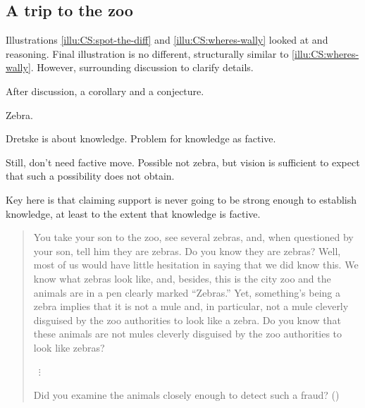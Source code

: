 \subsection{A trip to the zoo}

\begin{note}
  Illustrations \ref{illu:CS:spot-the-diff} and \ref{illu:CS:wheres-wally} looked at  and reasoning.
  Final illustration is no different, structurally similar to \autoref{illu:CS:wheres-wally}.
  However, surrounding discussion to clarify details.

  After discussion, a corollary and a conjecture.
\end{note}

\begin{note}
  Zebra.

  Dretske is about knowledge.
  Problem for knowledge as factive.

  Still, don't need factive move.
  Possible not zebra, but vision is sufficient to expect that such a possibility does not obtain.

  Key here is that claiming support is never going to be strong enough to establish knowledge, at least to the extent that knowledge is factive.
\end{note}

\begin{note}
  \begin{illustration}
    \label{illu:CS:dretske-zebra}
    \mbox{}
    \vspace{-\baselineskip}
  \begin{quote}
    You take your son to the zoo, see several zebras, and, when questioned by your son, tell him they are zebras.
    Do you know they are zebras?
    Well, most of us would have little hesitation in saying that we did know this.
    We know what zebras look like, and, besides, this is the city zoo and the animals are in a pen clearly marked ``Zebras.''
    Yet, something's being a zebra implies that it is not a mule and, in particular, not a mule cleverly disguised by the zoo authorities to look like a zebra.
    Do you know that these animals are not mules cleverly disguised by the zoo authorities to look like zebras?

    \mbox{ }\hfill \(\vdots\) \hfill\mbox{ }

    Did you examine the animals closely enough to detect such a fraud?\linebreak
    \mbox{}\hfill\mbox{(\citeyear[1015--1016]{Dretske:1970to})}
  \end{quote}
  \vspace{-\baselineskip}
  \end{illustration}
\end{note}

